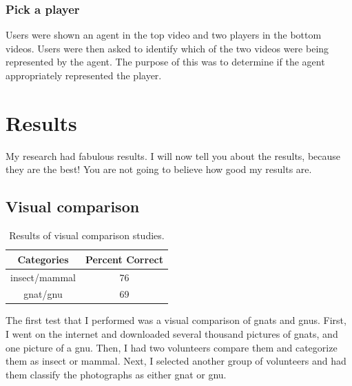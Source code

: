 \documentclass[12pt]{thesis}
\begin{document}
\subsection{Pick a player}
Users were shown an agent in the top video and two players in the bottom videos. 
Users were then asked to identify which of the two videos were being 
represented by the agent. The purpose of this was to determine if the agent 
appropriately represented the player.



\chapter{Results}
My research had fabulous results. I will now tell you about
the results, because they are the best!  You are not going
to believe how good my results are.

\section{Visual comparison}

\begin{table}
\caption{Results of visual comparison studies.}
\begin{center}
  \begin{tabular}{|c|c|}
    \hline
    \bf Categories & \bf Percent Correct\\
    \hline
    \hline
    insect/mammal & 76\\
    \hline
    gnat/gnu & 69\\
    \hline
  \end{tabular}
\end{center}
\label{table:comp1}
\end{table}

The first test that I performed was a visual comparison of gnats and
gnus.  First, I went on the internet and downloaded several thousand
pictures of gnats, and one picture of a gnu.  Then, I had two
volunteers compare them and categorize them as insect
or mammal.
Next, I selected another group of volunteers and
had them classify the photographs as either gnat or gnu.
\end{document}

